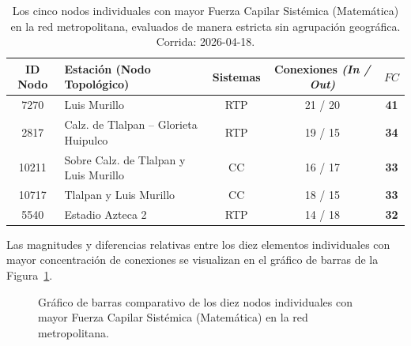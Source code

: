 \begin{table}[H]
    \centering
    \caption[Top 5 Nodos con mayor Fuerza Capilar Sistémica (Matemática)]{
    Los cinco nodos individuales con mayor Fuerza Capilar Sistémica (Matemática)
    en la red metropolitana, evaluados de manera estricta sin agrupación
    geográfica. Corrida: 2026-04-18.}
    \label{tab:fuerza-capilar-matematica}
    \fontsize{9.5pt}{11.5pt}\selectfont
    \begin{tabular}{|c|l|c|c|c|}
        \hline
        \textbf{ID Nodo} & \textbf{Estación (Nodo Topológico)} & \textbf{Sistemas} & \textbf{Conexiones} \textit{(In / Out)} & \textbf{$FC$} \\
        \hline
        7270  & Luis Murillo                          & RTP & 21 / 20 & \textbf{41} \\
        \hline
        2817  & Calz. de Tlalpan -- Glorieta Huipulco & RTP & 19 / 15 & \textbf{34} \\
        \hline
        10211 & Sobre Calz. de Tlalpan y Luis Murillo & CC  & 16 / 17 & \textbf{33} \\
        \hline
        10717 & Tlalpan y Luis Murillo                & CC  & 18 / 15 & \textbf{33} \\
        \hline
        5540  & Estadio Azteca 2                      & RTP & 14 / 18 & \textbf{32} \\
        \hline
    \end{tabular}
    \vspace{1ex}
\end{table}

Las magnitudes y diferencias relativas entre los diez elementos individuales con
mayor concentración de conexiones se visualizan en el gráfico de barras de la
Figura~\ref{fig:barplot-nodos-matematicos}.

\begin{figure}[H]
    \centering
    \caption[Distribución de los principales nodos individuales por Fuerza Capilar]{
    Gráfico de barras comparativo de los diez nodos individuales con mayor
    Fuerza Capilar Sistémica (Matemática) en la red metropolitana.}
    \label{fig:barplot-nodos-matematicos}
\end{figure}

